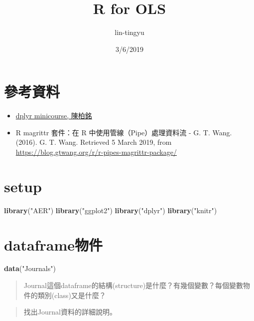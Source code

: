 \documentclass[]{article}
\title{R for OLS}
\author{lin-tingyu}
\date{3/6/2019}
\newenvironment{Shaded}{\begin{snugshade}}{\end{snugshade}}
\newcommand{\KeywordTok}[1]{\textcolor[rgb]{0.13,0.29,0.53}{\textbf{#1}}}
\newcommand{\StringTok}[1]{\textcolor[rgb]{0.31,0.60,0.02}{#1}}
\newcommand{\NormalTok}[1]{#1}
\begin{document}
\maketitle

{
\setcounter{tocdepth}{3}
\tableofcontents
}
\section{參考資料}

\begin{itemize}
\item
  \href{https://bookdown.org/PoMingChen/Dplyr_minicourse/}{dplyr
  minicourse, 陳柏銘}
\item
  R magrittr 套件：在 R 中使用管線（Pipe）處理資料流 - G. T. Wang.
  (2016). G. T. Wang. Retrieved 5 March 2019, from
  \url{https://blog.gtwang.org/r/r-pipes-magrittr-package/}
\end{itemize}

\section{setup}\label{setup}

\begin{Shaded}
\begin{Highlighting}[]
\KeywordTok{library}\NormalTok{(}\StringTok{"AER"}\NormalTok{)}
\KeywordTok{library}\NormalTok{(}\StringTok{"ggplot2"}\NormalTok{)}
\KeywordTok{library}\NormalTok{(}\StringTok{"dplyr"}\NormalTok{)}
\KeywordTok{library}\NormalTok{(}\StringTok{"knitr"}\NormalTok{)}
\end{Highlighting}
\end{Shaded}

\section{dataframe物件}\label{dataframe}

\begin{Shaded}
\begin{Highlighting}[]
\KeywordTok{data}\NormalTok{(}\StringTok{"Journals"}\NormalTok{)}
\end{Highlighting}
\end{Shaded}

\begin{quote}
Journal這個dataframe的結構(structure)是什麼？有幾個變數？每個變數物件的類別(class)又是什麼？
\end{quote}

\begin{quote}
找出Journal資料的詳細說明。
\end{quote}
\end{document}
